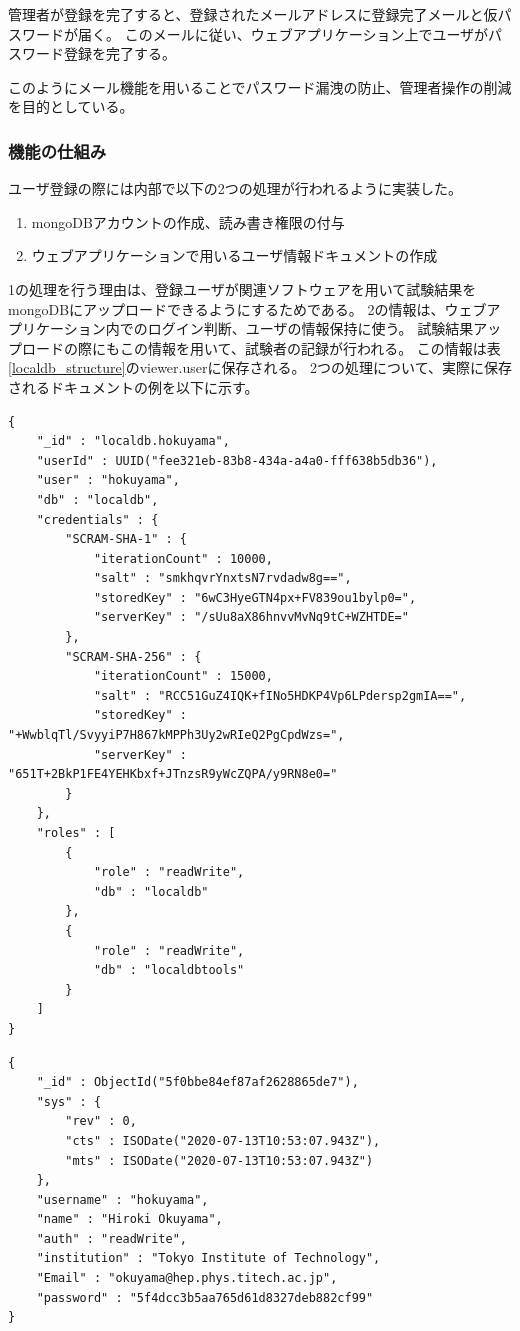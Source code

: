 管理者が登録を完了すると、登録されたメールアドレスに登録完了メールと仮パスワードが届く。
このメールに従い、ウェブアプリケーション上でユーザがパスワード登録を完了する。

このようにメール機能を用いることでパスワード漏洩の防止、管理者操作の削減を目的としている。

\subsubsection{機能の仕組み}
ユーザ登録の際には内部で以下の2つの処理が行われるように実装した。

\begin{enumerate}
  \item mongoDBアカウントの作成、読み書き権限の付与
  \item ウェブアプリケーションで用いるユーザ情報ドキュメントの作成
\end{enumerate}

1の処理を行う理由は、登録ユーザが関連ソフトウェアを用いて試験結果をmongoDBにアップロードできるようにするためである。
2の情報は、ウェブアプリケーション内でのログイン判断、ユーザの情報保持に使う。
試験結果アップロードの際にもこの情報を用いて、試験者の記録が行われる。
この情報は表\ref{localdb_structure}のviewer.userに保存される。
2つの処理について、実際に保存されるドキュメントの例を以下に示す。

\begin{lstlisting}[caption=hoge,label=fuga]
{
	"_id" : "localdb.hokuyama",
	"userId" : UUID("fee321eb-83b8-434a-a4a0-fff638b5db36"),
	"user" : "hokuyama",
	"db" : "localdb",
	"credentials" : {
		"SCRAM-SHA-1" : {
			"iterationCount" : 10000,
			"salt" : "smkhqvrYnxtsN7rvdadw8g==",
			"storedKey" : "6wC3HyeGTN4px+FV839ou1bylp0=",
			"serverKey" : "/sUu8aX86hnvvMvNq9tC+WZHTDE="
		},
		"SCRAM-SHA-256" : {
			"iterationCount" : 15000,
			"salt" : "RCC51GuZ4IQK+fINo5HDKP4Vp6LPdersp2gmIA==",
			"storedKey" : "+WwblqTl/SvyyiP7H867kMPPh3Uy2wRIeQ2PgCpdWzs=",
			"serverKey" : "651T+2BkP1FE4YEHKbxf+JTnzsR9yWcZQPA/y9RN8e0="
		}
	},
	"roles" : [
		{
			"role" : "readWrite",
			"db" : "localdb"
		},
		{
			"role" : "readWrite",
			"db" : "localdbtools"
		}
	]
}
\end{lstlisting}
\begin{lstlisting}[caption=hoge,label=fuga]
{
	"_id" : ObjectId("5f0bbe84ef87af2628865de7"),
	"sys" : {
		"rev" : 0,
		"cts" : ISODate("2020-07-13T10:53:07.943Z"),
		"mts" : ISODate("2020-07-13T10:53:07.943Z")
	},
	"username" : "hokuyama",
	"name" : "Hiroki Okuyama",
	"auth" : "readWrite",
	"institution" : "Tokyo Institute of Technology",
	"Email" : "okuyama@hep.phys.titech.ac.jp",
	"password" : "5f4dcc3b5aa765d61d8327deb882cf99"
}
\end{lstlisting}

